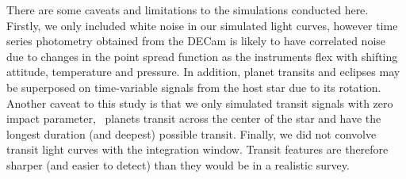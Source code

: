 

There are some caveats and limitations to the simulations conducted here.
Firstly, we only included white noise in our simulated light curves, however
time series photometry obtained from the DECam is likely to have correlated
noise due to changes in the point spread function as the instruments flex with
shifting attitude, temperature and pressure.
In addition, planet transits and eclipses may be superposed on time-variable
signals from the host star due to its rotation.
Another caveat to this study is that we only simulated transit signals with
zero impact parameter, \ie\ planets transit across the center of the star and
have the longest duration (and deepest) possible transit.
Finally, we did not convolve transit light curves with the integration window.
Transit features are therefore sharper (and easier to detect) than they would
be in a realistic survey.

